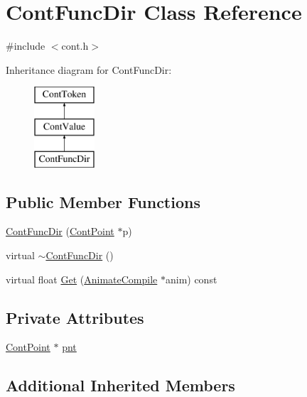 \hypertarget{a00052}{\section{Cont\-Func\-Dir Class Reference}
\label{a00052}
}


{\ttfamily \#include $<$cont.\-h$>$}

Inheritance diagram for Cont\-Func\-Dir\-:\begin{figure}[H]
\begin{center}
\leavevmode
\includegraphics[height=3.000000cm]{a00052}
\end{center}
\end{figure}
\subsection*{Public Member Functions}
\begin{DoxyCompactItemize}
\item 
\hyperlink{a00052_a0ece4d71b207011e42e531c5721a1fba}{Cont\-Func\-Dir} (\hyperlink{a00062}{Cont\-Point} $\ast$p)
\item 
virtual \hyperlink{a00052_af3c5d0aa1a9a3fe183bfff5c412f4694}{$\sim$\-Cont\-Func\-Dir} ()
\item 
virtual float \hyperlink{a00052_ac2fbca045989da578c7fe551c0eadeea}{Get} (\hyperlink{a00007}{Animate\-Compile} $\ast$anim) const 
\end{DoxyCompactItemize}
\subsection*{Private Attributes}
\begin{DoxyCompactItemize}
\item 
\hyperlink{a00062}{Cont\-Point} $\ast$ \hyperlink{a00052_aae431b4159623c57365bf905bbe8de00}{pnt}
\end{DoxyCompactItemize}
\subsection*{Additional Inherited Members}



